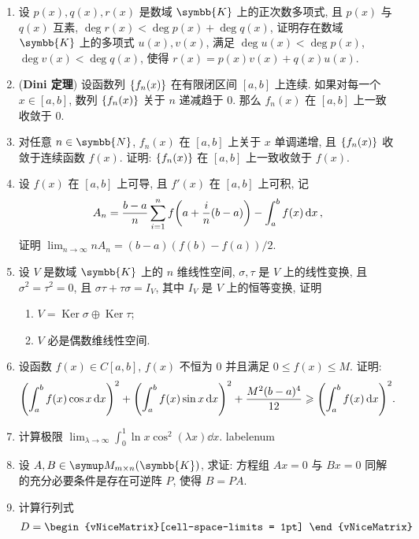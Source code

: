 \documentclass{ctexart}
\makeatletter
\let\set\qty
\let\emph\textbf
\let\ge\geqslant
\let\le\leqslant
\def\asteriskitem{*}
\def\sitem{%
  \expandafter\let\expandafter\originallabel\csname labelenum\romannumeral\@enumdepth\endcsname
  \expandafter\def\csname labelenum\romannumeral\@enumdepth\expandafter\endcsname\expandafter{%
    \expandafter\bfseries\expandafter\color{red}\expandafter{\expandafter\asteriskitem\expandafter\originallabel}}%
  \item
  \expandafter\let\csname labelenum\romannumeral\@enumdepth\endcsname\originallabel
}
\newcommand{\limit}[2]{\lim_{#1 \to #2}}
\newcommand{\K}{\ensuremath{\symbb{K}}}
\newcommand{\N}{\ensuremath{\symbb{N}}}
\DeclareMathOperator{\Ker}{Ker}
\makeatother
\begin{document}
\begin{enumerate}[series=exer]
    \item 设 $ p(x), q(x), r(x) $ 是数域 $ \K $ 上的正次数多项式, 且 $ p(x) $ 与 $ q(x) $ 互素, $ \deg r(x) < \deg p(x) + \deg q(x) $, 证明存在数域 $ \K $ 上的多项式 $ u(x), v(x) $, 满足 $ \deg u(x) < \deg p(x) $, $ \deg v(x) < \deg q(x) $, 使得 $ r(x) = p(x)v(x) + q(x)u(x) $.
    \item (\emph{Dini 定理}) 设函数列 $ \set{f_{n}(x)} $ 在有限闭区间 $ [a, b] $ 上连续. 如果对每一个 $ x\in [a, b] $, 数列 $ \set{f_{n}(x)} $ 关于 $ n $ 递减趋于 $ 0 $. 那么 $ f_{n}(x) $ 在 $ [a, b] $ 上一致收敛于 $ 0 $.
    \item 对任意 $ n\in \N $, $ f_{n}(x) $ 在 $ [a, b] $ 上关于 $ x $ 单调递增, 且 $ \set{f_{n}(x)} $ 收敛于连续函数 $ f(x) $. 证明: $ \set{f_{n}(x)} $ 在 $ [a, b] $ 上一致收敛于 $ f(x) $.
    \item 设 $ f(x) $ 在 $ [a, b] $ 上可导, 且 $ f'(x) $ 在 $ [a, b] $ 上可积, 记 
    \begin{align*}
        A_{n} = \frac{b - a}{n}\sum_{i = 1}^{n} f\qty(a + \frac{i}{n}(b - a)) - \int_{a}^{b} f(x) \dd{x},
    \end{align*}
    证明 $ \limit{n}{\infty} nA_{n} = (b - a)(f(b) - f(a))/2 $.
    \item 设 $ V $ 是数域 $ \K $ 上的 $ n $ 维线性空间, $ \sigma, \tau $ 是 $ V $ 上的线性变换, 且 $ \sigma^{2} = \tau^{2} = 0 $, 且 $ \sigma\tau + \tau\sigma = I_{V} $, 其中 $ I_{V} $ 是 $ V $ 上的恒等变换, 证明
    \begin{enumerate}
        \item $ V = \Ker \sigma \oplus \Ker \tau $;
        \item $ V $ 必是偶数维线性空间.
    \end{enumerate}
    \item 设函数 $ f(x) \in C[a, b] $, $ f(x) $ 不恒为 $ 0 $ 并且满足 $ 0 \le f(x) \le M $. 证明:
    \begin{align*}
        \qty(\int_{a}^{b} f(x) \cos x \dd{x})^{2} + \qty(\int_{a}^{b} f(x) \sin x \dd{x})^{2} + \frac{M^{2}(b-a)^{4}}{12} \ge \qty(\int_{a}^{b} f(x) \dd{x})^{2}.
    \end{align*}
    \item 计算极限 $ \limit{\lambda}{\infty} \int_{0}^{1} \ln x\cos^{2}(\lambda x) \dd{x} $.
    \sitem 设 $ A, B \in \MM[\K][m\times n] $, 求证: 方程组 $ Ax = 0 $ 与 $ Bx = 0 $ 同解的充分必要条件是存在可逆阵 $ P $, 使得 $ B = PA $.
    \item 计算行列式
    \begin{align*}
        D = \begin{vNiceMatrix}[cell-space-limits = 1pt]

\end{vNiceMatrix}
\end{align*}
\end{enumerate}
\end{document}
